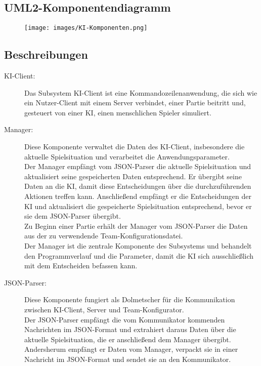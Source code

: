 \subsection{UML2-Komponentendiagramm}
\begin{center}
    \begin{figure}[H]
        \centering
        \texttt{[image: images/KI-Komponenten.png]}
    \end{figure}
\end{center}


\subsection{Beschreibungen}
\begin{description}
	\item[KI-Client:] 
	Das Subsystem KI-Client ist eine Kommandozeilenanwendung, die sich wie ein Nutzer-Client mit einem Server verbindet, einer Partie beitritt und, gesteuert von einer KI, einen menschlichen Spieler simuliert. 
	\\
	\item[Manager:]
	Diese Komponente verwaltet die Daten des KI-Client, insbesondere die aktuelle Spielsituation und verarbeitet die Anwendungsparameter.\\ Der Manager empfängt vom JSON-Parser die aktuelle Spielsituation und aktualisiert seine gespeicherten Daten entsprechend. Er übergibt seine Daten an die KI, damit diese Entscheidungen über die durchzuführenden Aktionen treffen kann. Anschließend empfängt er die Entscheidungen der KI und aktualisiert die gespeicherte Spielsituation entsprechend, bevor er sie dem JSON-Parser übergibt.\\
	Zu Beginn einer Partie erhält der Manager vom JSON-Parser die Daten aus der zu verwendende Team-Konfigurationsdatei. \\
	Der Manager ist die zentrale Komponente des Subsystems und behandelt den Programmverlauf und die Parameter, damit die KI sich ausschließlich mit dem Entscheiden befassen kann.
	\\
	\item[JSON-Parser:]
	Diese Komponente fungiert als Dolmetscher für die Kommunikation zwischen KI-Client, Server und Team-Konfigurator.\\
	Der JSON-Parser empfängt die vom Kommunikator kommenden Nachrichten im JSON-Format und extrahiert daraus Daten über die aktuelle Spielsituation, die er anschließend dem Manager übergibt. Andersherum empfängt er Daten vom Manager, verpackt sie in einer Nachricht im JSON-Format und sendet sie an den Kommunikator.\\

\end{description}
